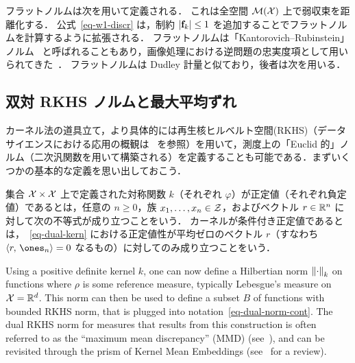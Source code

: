 \begin{example}
フラットノルムは次を用いて定義される．
これは全空間 $\mathcal{M}(\mathcal{X})$ 上で弱収束を距離化する．
%
公式~\eqref{eq-w1-discr} は，制約 $\left\lvert\mathrm{\textbf{f}}_k\right\rvert \leq 1$ を追加することでフラットノルムを計算するように拡張される．
%
フラットノルムは「Kantorovich--Rubinstein」ノルム~\citep{hanin1992kantorovich} と呼ばれることもあり，画像処理における逆問題の忠実度項として用いられてきた~\citep{lellmann2014imaging}．
%
フラットノルムは Dudley 計量と似ており，後者は次を用いる．
\end{example}


\subsection{双対 RKHS ノルムと最大平均ずれ}
\label{sec-mmd}


カーネル法の道具立て，より具体的には再生核ヒルベルト空間(RKHS)（データサイエンスにおける応用の概観は~\citep{scholkopf2002learning} を参照）を用いて，測度上の「Euclid 的」ノルム（二次汎関数を用いて構築される）を定義することも可能である．まずいくつかの基本的な定義を思い出しておこう．

\begin{defn}\label{def-negativedefinitekernel}
集合 $\mathcal{X} \times \mathcal{X}$ 上で定義された対称関数 $k$（それぞれ $\varphi$）が正定値（それぞれ負定値）であるとは，任意の $n\geq0$，族 $x_1,\dots,x_n\in\mathcal{Z}$，およびベクトル $r\in\mathbb{R}^n$ に対して次の不等式が成り立つことをいう．
カーネルが条件付き正定値であるとは，~\eqref{eq-dual-kern} における正定値性が平均ゼロのベクトル $r$（すなわち $\dotp{r}{\ones_n}=0$ なるもの）に対してのみ成り立つことをいう．
\end{defn}


Using a positive definite kernel $k$, one can now define a Hilbertian norm $\left\| \cdot \right\|_k$ on functions
where $\rho$ is some reference measure, typically Lebesgue's measure on $\mathcal{X}=\mathbb{R}^d$. This norm can then be used to define a subset $B$ of functions with bounded RKHS norm,
%
that is plugged into notation~\eqref{eq-dual-norm-cont}. The dual RKHS norm for measures that results from this construction is often referred to as the ``maximum mean discrepancy'' (MMD) (see~\citet{gretton2007kernel}), and can be revisited through the prism of Kernel Mean Embeddings (see~\citet{muandet2017kernel} for a review).
\fi



